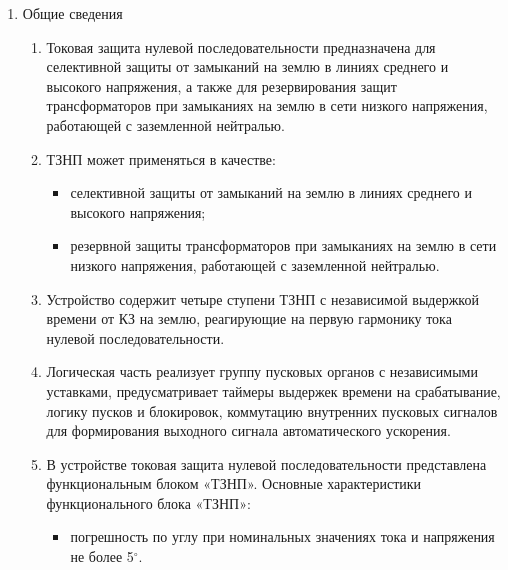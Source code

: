 
\color{black}

\begin{enumerate}

\item Общие сведения

\begin{enumerate}

\item
Токовая защита нулевой последовательности предназначена для селективной защиты от замыканий на землю в линиях среднего и высокого напряжения, а также для резервирования защит трансформаторов при замыканиях на землю в сети низкого напряжения, работающей с заземленной нейтралью.

\item
ТЗНП может применяться в качестве:
\begin{itemize}
    \item селективной защиты от замыканий на землю в линиях среднего и высокого напряжения;
    \item резервной защиты трансформаторов при замыканиях на землю в сети низкого напряжения, работающей с заземленной нейтралью.
\end{itemize}

\item
Устройство содержит четыре ступени ТЗНП с независимой выдержкой времени от КЗ на землю, реагирующие на первую гармонику тока нулевой последовательности.

\item
Логическая часть реализует группу пусковых органов с независимыми уставками, предусматривает таймеры выдержек времени на срабатывание, логику пусков и блокировок, коммутацию внутренних пусковых сигналов для формирования выходного сигнала автоматического ускорения.

\item 
В устройстве токовая защита нулевой последовательности представлена функциональным блоком «ТЗНП». Основные характеристики функционального блока «ТЗНП»:
\begin{itemize}
    \item погрешность по углу при номинальных значениях тока и напряжения не более 5$^\circ$.
\end{itemize}


\end{enumerate}
\end{enumerate}
